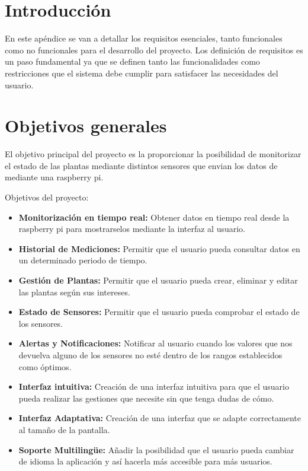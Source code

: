 
\section{Introducción}
En este apéndice se van a detallar los requisitos esenciales, tanto funcionales como no funcionales para el desarrollo del proyecto. Los definición de requisitos es un paso fundamental ya que se definen tanto las funcionalidades como restricciones que el sistema debe cumplir para satisfacer las necesidades del usuario.

\section{Objetivos generales}
El objetivo principal del proyecto es la proporcionar la posibilidad de monitorizar el estado de las plantas mediante distintos sensores que envian los datos de mediante una raspberry pi.

Objetivos del proyecto:
    \begin{itemize}
        \item \textbf{Monitorización en tiempo real:} Obtener datos en tiempo real desde la raspberry pi para mostrarselos mediante la interfaz al usuario.
        \item \textbf{Historial de Mediciones:} Permitir que el usuario pueda consultar datos en un determinado periodo de tiempo.
        \item \textbf{Gestión de Plantas:} Permitir que el usuario pueda crear, eliminar y editar las plantas según sus intereses.
        \item \textbf{Estado de Sensores:} Permitir que el usuario pueda comprobar el estado de los sensores.
        \item \textbf{Alertas y Notificaciones:} Notificar al usuario cuando los valores que nos devuelva alguno de los sensores no esté dentro de los rangos establecidos como óptimos.
        \item \textbf{Interfaz intuitiva:} Creación de una interfaz intuitiva para que el usuario pueda realizar las gestiones que necesite sin que tenga dudas de cómo.
        \item \textbf{Interfaz Adaptativa:} Creación de una interfaz que se adapte correctamente al tamaño de la pantalla.
        \item \textbf{Soporte Multilingüe:} Añadir la posibilidad que el usuario pueda cambiar de idioma la aplicación y así hacerla más accesible para más usuarios.
    \end{itemize}


